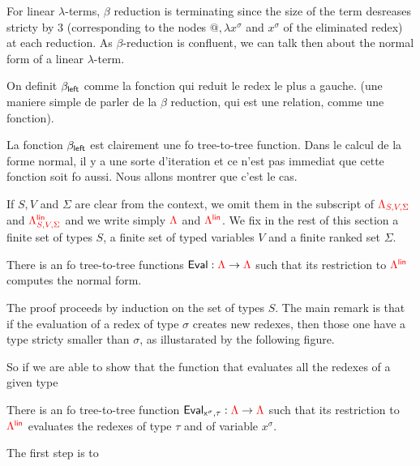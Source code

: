 For linear $\lambda$-terms, $\beta$ reduction is terminating since the size of the term desreases stricty by 3 (corresponding to the nodes $\text{@}, \lambda x^\sigma$ and $x^\sigma$ of the eliminated redex) at each reduction. As $\beta$-reduction is confluent, we can talk then about the normal form of a linear $\lambda$-term.

On definit $\beta_{\sf{left}}$ comme la fonction qui reduit le redex le plus a gauche. (une maniere simple de parler de la $\beta$ reduction, qui est une relation, comme une fonction).

La fonction $\beta_{\sf{left}}$ est clairement une fo tree-to-tree function.  
Dans le calcul de la forme normal, il y a une sorte d'iteration et ce n'est pas immediat que cette fonction soit fo aussi. Nous allons montrer que c'est le cas. 


If $S, V$ and $\Sigma$ are clear from the context, we omit them in the subscript of ${\color{red}{\Lambda_{S,V,\Sigma}}}$ and ${\color{red}{\Lambda^{\sf{lin}}_{S,V,\Sigma}}}$ and we write simply ${\color{red}{\Lambda}}$ and ${\color{red}{\Lambda^{\sf{lin}}}}$. We fix in the rest of this section a finite set of types $S$, a finite set of typed variables $V$ and a finite  ranked set $\Sigma$.
 

\begin{theorem}
There is an fo tree-to-tree functions ${\sf{Eval}}:{\color{red}{\Lambda}} \to{\color{red}{\Lambda}}$ such that its restriction to ${\color{red}{\Lambda^{\sf{lin}}}}$ computes the normal form.
\end{theorem}

The proof proceeds by induction on the set of types $S$. The main remark is that if the evaluation of a redex of type $\sigma$ creates new redexes, then those one have a type stricty smaller than $\sigma$, as illustarated by the following figure.

So if we are able to show that the function that evaluates all the redexes of a given type 

\begin{theorem}
There is an fo tree-to-tree function ${\sf{Eval}_{x^\sigma,\tau}}:{\color{red}{\Lambda}} \to{\color{red}{\Lambda}}$ such that its restriction to ${\color{red}{\Lambda^{\sf{lin}}}}$ evaluates the redexes of type $\tau$ and of variable $x^\sigma$.
\end{theorem}

The first step is to 